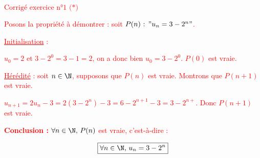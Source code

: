 \bigskip
\textbf{\textcolor{red}{$\boxed{\text{Corrigé exercice n°1 (*)}}$}}
\bigskip

\textcolor{red}{Posons la propriété à démontrer : soit $P(n)\text{ : }"u_{n}=3-2^{n}"$.}

\bigskip

\textcolor{red}{\underline{Initialisation} :}

\bigskip

\textcolor{red}{$u_{0}=2$ et $3-2^{0}=3-1=2$, on a donc bien $u_{0}=3-2^{0}$. $P(0)$ est vraie.}

\bigskip

\textcolor{red}{\underline{Hérédité} : soit $n \in \N$, supposons que $P(n)$ est vraie. Montrons que $P(n+1)$ est vraie.}

\bigskip

\textcolor{red}{$u_{n+1}=2u_{n}-3=2\left(3-2^{n}\right)-3=6-2^{n+1}-3=3-2^{n+}$. Donc $P(n+1)$ est vraie.}

\bigskip

\textcolor{red}{\textbf{Conclusion :} $\forall n \in \N\text{, }P(n)$ est vraie, c'est-à-dire :}

\textcolor{red}{$$\boxed{\forall n \in \N\text{, }u_{n}=3-2^{n}}$$}

\bigskip